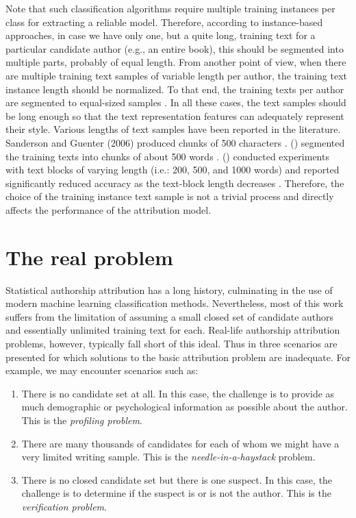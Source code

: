 Note that such classification algorithms require multiple training instances per class for extracting a reliable model. Therefore, according to instance-based approaches, in case
we have only one, but a quite long, training text for a particular candidate author (e.g., an entire book), this should be segmented into multiple parts, probably of equal length.
From another point of view, when there are multiple training text samples of variable length per author, the training text instance length should be normalized. To that end, the training texts per author are segmented to equal-sized samples \cite{sanderson2006short}. In all these cases, the text samples should be long enough so that the text representation features can adequately represent their style. Various lengths of text samples have been reported in the literature. Sanderson and Guenter (2006) produced chunks of 500 characters \cite{sanderson2006short}. \citeauthor{koppel2006authorship} (\citeyear{koppel2006authorship}) segmented the training texts into
chunks of about 500 words \cite{koppel2006authorship}. \citeauthor{hirst2007bigrams} (\citeyear{hirst2007bigrams}) conducted experiments with text blocks of varying length (i.e.: 200, 500, and 1000 words) and reported significantly reduced accuracy as the text-block length decreases \cite{hirst2007bigrams}. Therefore, the choice of the training instance text sample is not a trivial process and directly affects the performance of the attribution model.


\section{The real problem}

Statistical authorship attribution has a long history, culminating in the use of modern machine learning classification methods. Nevertheless, most of this work suffers from the limitation of assuming a small closed set of candidate authors and essentially unlimited training text for each. Real-life authorship attribution problems, however, typically fall short of this ideal. Thus in \cite{koppel2009computational} three scenarios are presented for which solutions to the basic attribution problem are inadequate.
For example, we may encounter scenarios such as:

\begin{enumerate}
	\item There is no candidate set at all. In this case, the challenge is to provide as much demographic or psychological information as possible about the author. This is the \textit{profiling problem}.
	\item There are many thousands of candidates for each of whom we might have a very limited writing sample. This is the \textit{needle-in-a-haystack} problem.
	\item There is no closed candidate set but there is one suspect. In this case, the challenge is to determine if the suspect is or is not the author. This is the \textit{verification problem}.
\end{enumerate}

